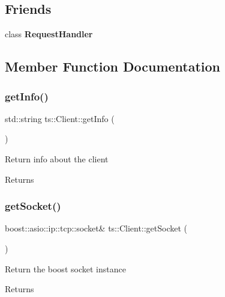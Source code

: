 \subsection*{Friends}
\begin{DoxyCompactItemize}
\item 
\mbox{\label{classts_1_1_client_a885dbb0d49886f3402b8ed12ab9c076a}} 
class {\bfseries Request\+Handler}
\end{DoxyCompactItemize}


\subsection{Member Function Documentation}
\mbox{\label{classts_1_1_client_a76240db1ee8a0c56be0e7b88e3f7e52e}} 
\subsubsection{\texorpdfstring{get\+Info()}{getInfo()}}
{\footnotesize\ttfamily std\+::string ts\+::\+Client\+::get\+Info (\begin{DoxyParamCaption}{ }\end{DoxyParamCaption})}

Return info about the client \begin{DoxyReturn}{Returns}

\end{DoxyReturn}
\mbox{\label{classts_1_1_client_a02aaec358cb00665465e5ebb0e031ea2}} 
\subsubsection{\texorpdfstring{get\+Socket()}{getSocket()}}
{\footnotesize\ttfamily boost\+::asio\+::ip\+::tcp\+::socket\& ts\+::\+Client\+::get\+Socket (\begin{DoxyParamCaption}{ }\end{DoxyParamCaption})}

Return the boost socket instance \begin{DoxyReturn}{Returns}

\end{DoxyReturn}
\mbox{\label{classts_1_1_client_a60a5793486ab652d476b930dc432884a}} 
